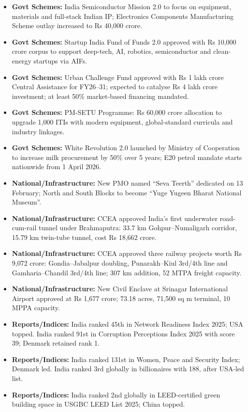 \documentclass[10pt,a4paper]{article}
\begin{document}
\begin{itemize}
    \item \textbf{Govt Schemes:} India Semiconductor Mission 2.0 to focus on equipment, materials and full-stack Indian IP; Electronics Components Manufacturing Scheme outlay increased to Rs 40,000 crore.
    \item \textbf{Govt Schemes:} Startup India Fund of Funds 2.0 approved with Rs 10,000 crore corpus to support deep-tech, AI, robotics, semiconductor and clean-energy startups via AIFs.
    \item \textbf{Govt Schemes:} Urban Challenge Fund approved with Rs 1 lakh crore Central Assistance for FY26--31; expected to catalyse Rs 4 lakh crore investment; at least 50\% market-based financing mandated.
    \item \textbf{Govt Schemes:} PM-SETU Programme: Rs 60,000 crore allocation to upgrade 1,000 ITIs with modern equipment, global-standard curricula and industry linkages.
    \item \textbf{Govt Schemes:} White Revolution 2.0 launched by Ministry of Cooperation to increase milk procurement by 50\% over 5 years; E20 petrol mandate starts nationwide from 1 April 2026.
    \item \textbf{National/Infrastructure:} New PMO named ``Seva Teerth'' dedicated on 13 February; North and South Blocks to become ``Yuge Yugeen Bharat National Museum''.
    \item \textbf{National/Infrastructure:} CCEA approved India's first underwater road-cum-rail tunnel under Brahmaputra: 33.7 km Gohpur--Numaligarh corridor, 15.79 km twin-tube tunnel, cost Rs 18,662 crore.
    \item \textbf{National/Infrastructure:} CCEA approved three railway projects worth Rs 9,072 crore: Gondia--Jabalpur doubling, Punarakh--Kiul 3rd/4th line and Gamharia--Chandil 3rd/4th line; 307 km addition, 52 MTPA freight capacity.
    \item \textbf{National/Infrastructure:} New Civil Enclave at Srinagar International Airport approved at Rs 1,677 crore; 73.18 acres, 71,500 sq m terminal, 10 MPPA capacity.
    \item \textbf{Reports/Indices:} India ranked 45th in Network Readiness Index 2025; USA topped. India ranked 91st in Corruption Perceptions Index 2025 with score 39; Denmark retained rank 1.
    \item \textbf{Reports/Indices:} India ranked 131st in Women, Peace and Security Index; Denmark led. India ranked 3rd globally in billionaires with 188, after USA-led list.
    \item \textbf{Reports/Indices:} India ranked 2nd globally in LEED-certified green building space in USGBC LEED List 2025; China topped.

\end{itemize}
\end{document}
